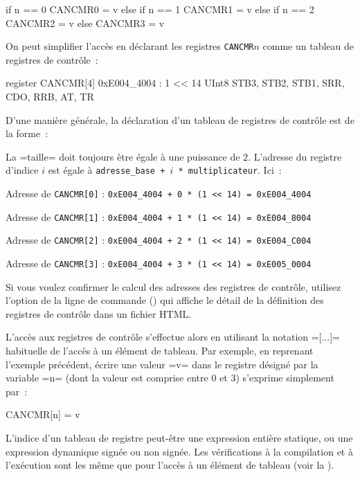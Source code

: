 \begin{PLM}
if n == 0 {
  CANCMR0 = v
}else if n == 1 {
  CANCMR1 = v
}else if n == 2 {
  CANCMR2 = v
}else{
  CANCMR3 = v
}
\end{PLM}

On peut simplifier l'accès en déclarant les registres \texttt{CANCMR$n$} comme un tableau de registres de contrôle~:

\begin{PLM}
register
  CANCMR[4] 0xE004_4004 : 1 << 14
UInt8 {
  STB3, STB2, STB1, SRR, CDO, RRB, AT, TR
}
\end{PLM}

D'une manière générale, la déclaration d'un tableau de registres de contrôle est de la forme~:

La \plm=taille= doit toujours être égale à une puissance de $2$. L'adresse du registre d'indice $i$ est égale à \texttt{adresse\_base + $i$ * multiplicateur}. Ici~:

Adresse de \texttt{CANCMR[0]} : \texttt{0xE004\_4004 + 0 * (1 << 14) = 0xE004\_4004}

Adresse de \texttt{CANCMR[1]} : \texttt{0xE004\_4004 + 1 * (1 << 14) = 0xE004\_8004}

Adresse de \texttt{CANCMR[2]} : \texttt{0xE004\_4004 + 2 * (1 << 14) = 0xE004\_C004}

Adresse de \texttt{CANCMR[3]} : \texttt{0xE004\_4004 + 3 * (1 << 14) = 0xE005\_0004}

Si vous voulez confirmer le calcul des adresses des registres de contrôle, utilisez l'option de la ligne de commande  () qui affiche le détail de la définition des registres de contrôle dans un fichier HTML.
 
L'accès aux registres de contrôle s'effectue alors en utilisant la notation \plm=[...]= habituelle de l'accès à un élément de tableau. Par exemple, en reprenant l'exemple précédent, écrire une valeur \plm=v= dans le registre désigné par la variable \plm=n= (dont la valeur est comprise entre $0$ et $3$) s'exprime simplement par~:

\begin{PLM}
CANCMR[n] = v
\end{PLM}

L'indice d'un tableau de registre peut-être une expression entière statique, ou une expression dynamique signée ou non signée. Les vérifications à la compilation et à l'exécution sont les même que pour l'accès à un élément de tableau (voir la ).

